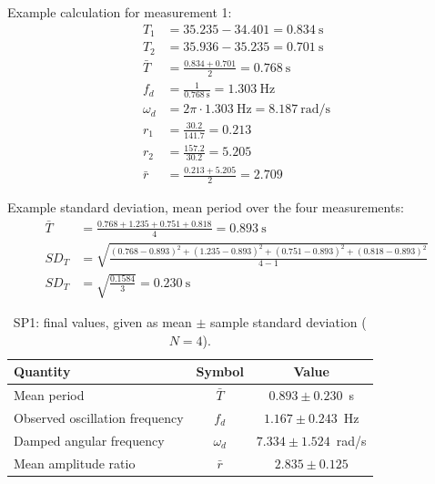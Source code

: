 \documentclass[11pt,a4paper]{article}
\begin{document}
Example calculation for measurement 1:
\begin{align*}
T_1 &= 35.235 - 34.401 = 0.834~\text{s} \\
T_2 &= 35.936 - 35.235 = 0.701~\text{s} \\
\bar{T} &= \frac{0.834 + 0.701}{2} = 0.768~\text{s} \\
f_d &= \frac{1}{0.768~\text{s}} = 1.303~\text{Hz} \\
\omega_d &= 2\pi \cdot 1.303~\text{Hz} = 8.187~\text{rad/s} \\
r_1 &= \frac{30.2}{141.7} = 0.213 \\
r_2 &= \frac{157.2}{30.2} = 5.205 \\
\bar{r} &= \frac{0.213 + 5.205}{2} = 2.709
\end{align*}

Example standard deviation, mean period over the four measurements:
\begin{align*}
\bar{T} &= \frac{0.768 + 1.235 + 0.751 + 0.818}{4} = 0.893~\text{s} \\
SD_{T} &= \sqrt{\frac{(0.768-0.893)^2 + (1.235-0.893)^2 + (0.751-0.893)^2 + (0.818-0.893)^2}{4-1}} \\
SD_{T} &= \sqrt{\frac{0.1584}{3}} = 0.230~\text{s}
\end{align*}

\begin{table}[H]
    \centering
    \caption{SP1: final values, given as mean $\pm$ sample standard deviation ($N = 4$).}
    \label{tab:sp1_results}
    \renewcommand{\arraystretch}{1.6}
    \begin{tabular}{|l|c|c|}
        \hline
        \textbf{Quantity} & \textbf{Symbol} & \textbf{Value} \\
        \hline
        Mean period                    & $\bar{T}$  & $0.893 \pm 0.230$~s \\ \hline
        Observed oscillation frequency & $f_d$      & $1.167 \pm 0.243$~Hz \\ \hline
        Damped angular frequency       & $\omega_d$ & $7.334 \pm 1.524$~rad/s \\ \hline
        Mean amplitude ratio           & $\bar{r}$  & $2.835 \pm 0.125$ \\ \hline
    \end{tabular}
\end{table}
\end{document}
